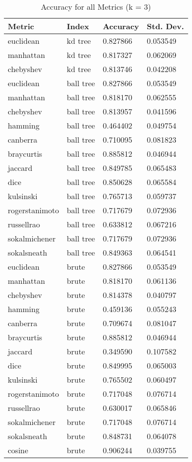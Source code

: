 \begin{table}
  \centering
  \caption{Accuracy for all Metrics (k = 3)}
  \begin{tabular}{|l|l|l|l|}
    \hline
    {\bf Metric} & {\bf Index} & {\bf Accuracy} & {\bf Std. Dev.} \\\hline
    euclidean & kd tree & 0.827866 & 0.053549 \\\hline
    manhattan & kd tree & 0.817327 & 0.062069 \\\hline
    chebyshev & kd tree & 0.813746 & 0.042208 \\\hline
    euclidean & ball tree & 0.827866 & 0.053549 \\\hline
    manhattan & ball tree & 0.818170 & 0.062555 \\\hline
    chebyshev & ball tree & 0.813957 & 0.041596 \\\hline
    hamming & ball tree & 0.464402 & 0.049754 \\\hline
    canberra & ball tree & 0.710095 & 0.081823 \\\hline
    braycurtis & ball tree & 0.885812 & 0.046944 \\\hline
    jaccard & ball tree & 0.849785 & 0.065483 \\\hline
    dice & ball tree & 0.850628 & 0.065584 \\\hline
    kulsinski & ball tree & 0.765713 & 0.059737 \\\hline
    rogerstanimoto & ball tree & 0.717679 & 0.072936 \\\hline
    russellrao & ball tree & 0.633812 & 0.067216 \\\hline
    sokalmichener & ball tree & 0.717679 & 0.072936 \\\hline
    sokalsneath & ball tree & 0.849363 & 0.064541 \\\hline
    euclidean & brute & 0.827866 & 0.053549 \\\hline
    manhattan & brute & 0.818170 & 0.061136 \\\hline
    chebyshev & brute & 0.814378 & 0.040797 \\\hline
    hamming & brute & 0.459136 & 0.055243 \\\hline
    canberra & brute & 0.709674 & 0.081047 \\\hline
    braycurtis & brute & 0.885812 & 0.046944 \\\hline
    jaccard & brute & 0.349590 & 0.107582 \\\hline
    dice & brute & 0.849995 & 0.065003 \\\hline
    kulsinski & brute & 0.765502 & 0.060497 \\\hline
    rogerstanimoto & brute & 0.717048 & 0.076714 \\\hline
    russellrao & brute & 0.630017 & 0.065846 \\\hline
    sokalmichener & brute & 0.717048 & 0.076714 \\\hline
    sokalsneath & brute & 0.848731 & 0.064078 \\\hline
    cosine & brute & 0.906244 & 0.039755 \\\hline
  \end{tabular}
  \tableSpace
\end{table}

